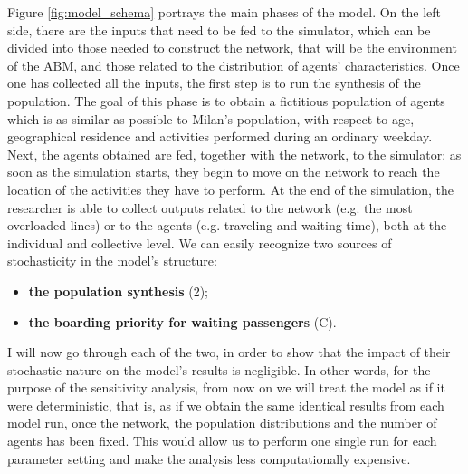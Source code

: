 Figure \ref{fig:model_schema} portrays the main phases of the model. On the left side, there are the inputs that need to be fed to the simulator, which can be divided into those needed to construct the network, that will be the environment of the ABM, and those related to the distribution of agents' characteristics. Once one has collected all the inputs, the first step is to run the synthesis of the population. The goal of this phase is to obtain a fictitious population of agents which is as similar as possible to Milan's population, with respect to age, geographical residence and activities performed during an ordinary weekday. Next, the agents obtained are fed, together with the network, to the simulator: as soon as the simulation starts, they begin to move on the network to reach the location of the activities they have to perform. At the end of the simulation, the researcher is able to collect outputs related to the network (e.g. the most overloaded lines) or to the agents (e.g. traveling and waiting time), both at the individual and collective level. 
We can easily recognize two sources of stochasticity in the model's structure:
\begin{itemize}
	\item \textbf{the population synthesis} (2);
	\item \textbf{the boarding priority for waiting passengers} (C). 
\end{itemize}
I will now go through each of the two, in order to show that the impact of their stochastic nature on the model's results is negligible. In other words, for the purpose of the sensitivity analysis, from now on we will treat the model as if it were deterministic, that is, as if we obtain the same identical results from each model run, once the network, the population distributions and the number of agents has been fixed. This would allow us to perform one single run for each parameter setting and make the analysis less computationally expensive.

